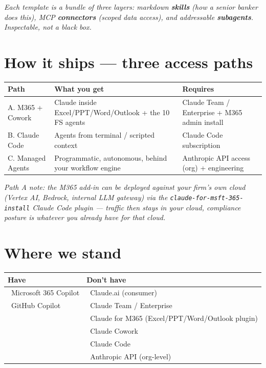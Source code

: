 \documentclass[10pt,a4paper]{article}
\newcommand{\good}{\textcolor{successgreen}{\textbf{\checkmark}}}
\newcommand{\bad}{\textcolor{warningred}{\textbf{\texttimes}}}
\begin{document}
\smallskip
\noindent\textit{\small Each template is a bundle of three layers: markdown \textbf{skills} (how a senior banker does this), MCP \textbf{connectors} (scoped data access), and addressable \textbf{subagents}. Inspectable, not a black box.}

\section*{How it ships --- three access paths}

\begin{tabularx}{\textwidth}{@{}lXl@{}}
\toprule
\textbf{Path} & \textbf{What you get} & \textbf{Requires} \\
\midrule
A. M365 + Cowork  & Claude inside Excel/PPT/Word/Outlook + the 10 FS agents     & Claude Team / Enterprise + M365 admin install \\
B. Claude Code    & Agents from terminal / scripted context                     & Claude Code subscription \\
C. Managed Agents & Programmatic, autonomous, behind your workflow engine       & Anthropic API access (org) + engineering \\
\bottomrule
\end{tabularx}

\smallskip
\noindent\textit{\small Path A note: the M365 add-in can be deployed against your firm's own cloud (Vertex AI, Bedrock, internal LLM gateway) via the \texttt{claude-for-msft-365-install} Claude Code plugin — traffic then stays in your cloud, compliance posture is whatever you already have for that cloud.}

\section*{Where we stand}

\begin{tabularx}{\textwidth}{@{}X X@{}}
\toprule
\textbf{Have} & \textbf{Don't have} \\
\midrule
\good\ Microsoft 365 Copilot           & \bad\ Claude.ai (consumer) \\
\good\ GitHub Copilot                  & \bad\ Claude Team / Enterprise \\
                                       & \bad\ Claude for M365 (Excel/PPT/Word/Outlook plugin) \\
                                       & \bad\ Claude Cowork \\
                                       & \bad\ Claude Code \\
                                       & \bad\ Anthropic API (org-level) \\
\bottomrule
\end{tabularx}
\end{document}
